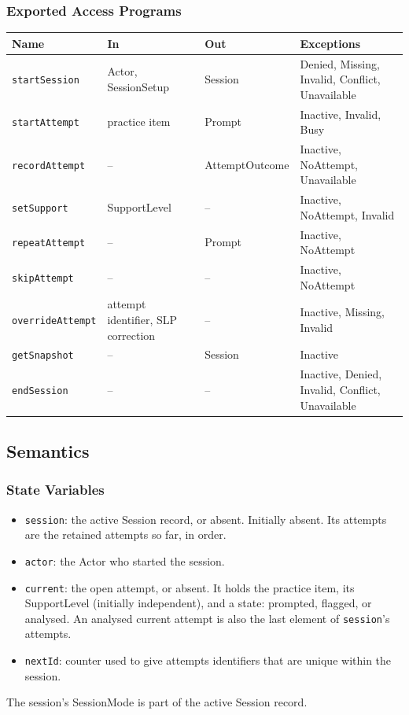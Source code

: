 \documentclass[12pt, titlepage]{article}
\begin{document}
\subsubsection{Exported Access Programs}
\noindent\begin{tabularx}{\textwidth}{@{}l X X X@{}}
\toprule
\textbf{Name} & \textbf{In} & \textbf{Out} & \textbf{Exceptions}\\
\midrule
\texttt{startSession} & Actor, SessionSetup & Session &
Denied, Missing, Invalid, Conflict, Unavailable\\
\texttt{startAttempt} & practice item & Prompt & Inactive, Invalid, Busy\\
\texttt{recordAttempt} & -- & AttemptOutcome & Inactive, NoAttempt,
Unavailable\\
\texttt{setSupport} & SupportLevel & -- & Inactive, NoAttempt, Invalid\\
\texttt{repeatAttempt} & -- & Prompt & Inactive, NoAttempt\\
\texttt{skipAttempt} & -- & -- & Inactive, NoAttempt\\
\texttt{overrideAttempt} & attempt identifier, SLP correction & -- &
Inactive, Missing, Invalid\\
\texttt{getSnapshot} & -- & Session & Inactive\\
\texttt{endSession} & -- & -- & Inactive, Denied, Invalid, Conflict,
Unavailable\\
\bottomrule
\end{tabularx}

\subsection{Semantics}

\subsubsection{State Variables}
\begin{itemize}
\item \texttt{session}: the active Session record, or absent. Initially absent.
Its attempts are the retained attempts so far, in order.
\item \texttt{actor}: the Actor who started the session.
\item \texttt{current}: the open attempt, or absent. It holds the practice
item, its SupportLevel (initially independent), and a state: prompted,
flagged, or analysed. An analysed current attempt is also the last element of
\texttt{session}'s attempts.
\item \texttt{nextId}: counter used to give attempts identifiers that are
unique within the session.
\end{itemize}
The session's SessionMode is part of the active Session record.
\end{document}
